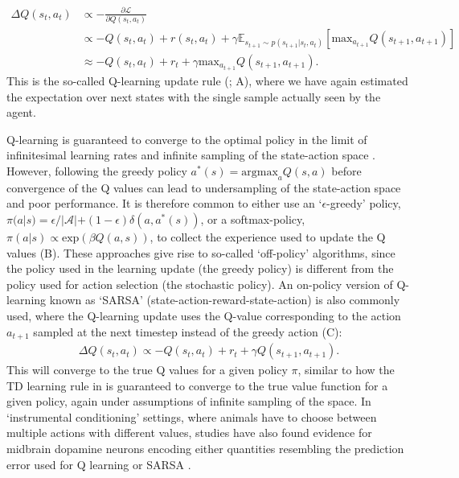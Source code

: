 \begin{align}
    \Delta  Q(s_t,a_t) & \propto - \frac{\partial \mathcal{L}}{\partial  Q(s_t,a_t)}\\
    &\propto - Q(s_t,a_t) + r(s_t, a_t) + \gamma \mathbb{E}_{s_{t+1} \sim p(s_{t+1} | s_t, a_t)} \left [ \text{max}_{a_{t+1}} Q(s_{t+1}, a_{t+1}) \right ] \\
    &\approx - Q(s_t,a_t) + r_t + \gamma \text{max}_{a_{t+1}} Q(s_{t+1}, a_{t+1}).
\end{align}
This is the so-called Q-learning update rule (\citealp{watkins1989learning}; A), where we have again estimated the expectation over next states with the single sample actually seen by the agent.

Q-learning is guaranteed to converge to the optimal policy in the limit of infinitesimal learning rates and infinite sampling of the state-action space \citep{watkins1992q,sutton2018reinforcement}.
However, following the greedy policy $a^*(s) = \text{argmax}_{a} Q(s, a)$ before convergence of the Q values can lead to undersampling of the state-action space and poor performance.
It is therefore common to either use an `$\epsilon$-greedy' policy, $\pi(a|s) = \epsilon / |\mathcal{A}| + (1-\epsilon) \delta(a, a^*(s))$, or a softmax-policy, $\pi(a|s) \propto \text{exp}(\beta Q(a, s))$, to collect the experience used to update the Q values (B).
These approaches give rise to so-called `off-policy' algorithms, since the policy used in the learning update (the greedy policy) is different from the policy used for action selection (the stochastic policy).
An on-policy version of Q-learning known as `SARSA' (state-action-reward-state-action) is also commonly used, where the Q-learning update uses the Q-value corresponding to the action $a_{t+1}$ sampled at the next timestep instead of the greedy action (C):
\begin{align}
    \Delta  Q(s_t,a_t) \propto - Q(s_t,a_t) + r_t + \gamma Q(s_{t+1}, a_{t+1}).
\end{align}
This will converge to the true Q values for a given policy $\pi$, similar to how the TD learning rule in  is guaranteed to converge to the true value function for a given policy, again under assumptions of infinite sampling of the space.
In `instrumental conditioning' settings, where animals have to choose between multiple actions with different values, studies have also found evidence for midbrain dopamine neurons encoding either quantities resembling the prediction error used for Q learning \citep{roesch2007dopamine,niv2009reinforcement} or SARSA \citep{morris2006midbrain,niv2009reinforcement}.

